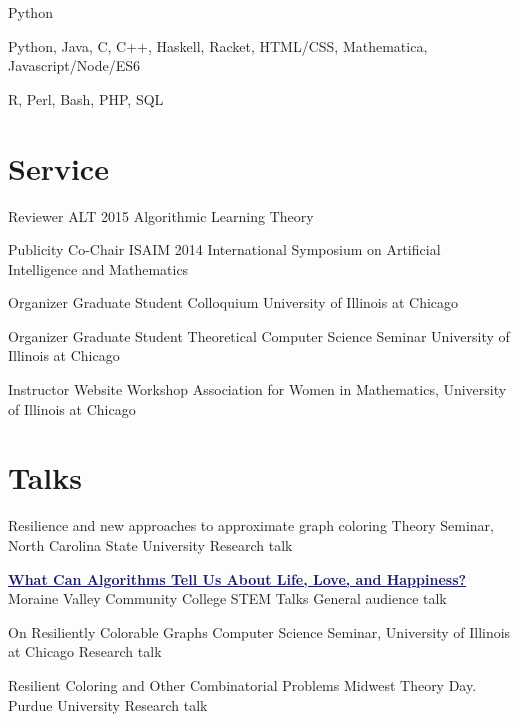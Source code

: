 \documentclass[11pt]{moderncv}
\begin{document}
         {Python}
      {}
{}
      {}
      {}

         {Python, Java, C, C++, Haskell, Racket, HTML/CSS, Mathematica, Javascript/Node/ES6}
      {}
{}
      {}
      {}

         {R, Perl, Bash, PHP, SQL}
      {}
{}
      {}
      {}


   \section{Service}
         {Reviewer}
      {ALT 2015}
      {Algorithmic Learning Theory}
      {}
{}

         {Publicity Co-Chair}
      {ISAIM 2014}
      {International Symposium on Artificial Intelligence and Mathematics}
      {}
{}

         {Organizer}
      {Graduate Student Colloquium}
      {University of Illinois at Chicago}
      {}
{}

         {Organizer}
      {Graduate Student Theoretical Computer Science Seminar}
      {University of Illinois at Chicago}
      {}
{}

         {Instructor}
      {Website Workshop}
      {Association for Women in Mathematics, University of Illinois at Chicago}
      {}
{}


   \section{Talks}
         {Resilience and new approaches to approximate graph coloring}
      {Theory Seminar, North Carolina State University}
      {Research talk}
      {}
{}

         {\href{https://www.youtube.com/watch?v=JH4DOjYX59Y}{\textcolor{MidnightBlue}{\underline{\textbf{What Can Algorithms Tell Us About Life, Love, and Happiness?}}}}}
      {Moraine Valley Community College STEM Talks}
      {General audience talk}
      {}
{}

         {On Resiliently Colorable Graphs}
      {Computer Science Seminar, University of Illinois at Chicago}
      {Research talk}
      {}
{}

         {Resilient Coloring and Other Combinatorial Problems}
      {Midwest Theory Day. Purdue University}
      {Research talk}
      {}
{}
\end{document}
